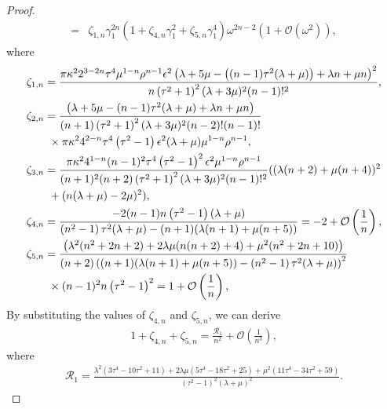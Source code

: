 \documentclass[11pt,reqno,twoside]{amsart}
\theoremstyle{definition}
\theoremstyle{remark}
\numberwithin{equation}{section}
\begin{document}
\begin{proof}
\begin{align}
		=&\zeta _{1,n}\gamma_1 ^{2n}\left(1+\zeta _{4,n} \gamma_1 ^{2}+\zeta _{5,n} \gamma_1 ^{4}\right)\omega ^{2n-2}\left(1+\mathcal{O}(\omega^{2})\right),\label{eq:unorm}
	\end{align}
	where
	\begin{align}
		&\zeta _{1,n}=\frac{\pi  \kappa^2 2^{3-2 n} \tau ^4 \mu ^{1-n} \rho ^{n-1} \epsilon^{2}\left(\lambda +5 \mu -\left((n-1) \tau ^2 (\lambda +\mu )\right)+\lambda  n+\mu  n\right)^2}{n \left(\tau ^2+1\right)^2 (\lambda +3 \mu )^2  (n-1)!^2},\label{eq:zetau}\\
		&\zeta_{2,n}=\frac{\left(\lambda +5 \mu -(n-1) \tau ^2 (\lambda +\mu )+\lambda  n+\mu  n\right)}{(n+1) \left(\tau ^2+1\right)^2 (\lambda +3 \mu )^2(n-2)!(n-1)!}\notag\\
		&\quad\quad\times \pi  \kappa^2 4^{2-n} \tau ^4 \left(\tau ^2-1\right) \epsilon ^2 (\lambda +\mu ) \mu ^{1-n} \rho ^{n-1},\notag\\
		&\zeta_{3,n}=\frac{\pi  \kappa^2 4^{1-n} (n-1)^2 \tau ^4 \left(\tau ^2-1\right)^2 \epsilon ^2 \mu ^{1-n} \rho ^{n-1} }{(n+1)^2 (n+2) \left(\tau ^2+1\right)^2 (\lambda +3 \mu )^2  (n-1)!^2}((\lambda  (n+2)+\mu  (n+4))^2\notag\\
		&\quad\quad+(n (\lambda +\mu )-2 \mu )^2),\notag\\
		&\zeta _{4,n}=\frac{-2 (n-1) n \left(\tau ^2-1\right) (\lambda +\mu )}{\left(n^2-1\right) \tau ^2 (\lambda +\mu )-(n+1) (\lambda  (n+1)+\mu  (n+5))}=-2+\mathcal{O}\left(\frac{1}{n}\right),\notag\\
		&\zeta _{5,n}=\frac{\left(\lambda ^2 (n^2+2n+2)+2 \lambda  \mu  (n (n+2)+4)+\mu ^2 (n^2+2n+10)\right)}{(n+2) \left((n+1) (\lambda  (n+1)+\mu  (n+5))-\left(n^2-1\right) \tau ^2 (\lambda +\mu )\right)^2}\notag\\
		&\quad\quad\times (n-1)^2 n \left(\tau ^2-1\right)^2=1+\mathcal{O}\left(\frac{1}{n}\right),\notag
	\end{align}
	By substituting the values of \(\zeta _{4,n}\) and \(\zeta _{5,n}\), we can derive	
	\begin{align}\label{eq:zetar}
		1+\zeta _{4,n}+\zeta _{5,n}=\frac{\mathcal{R}_{1}}{n^2}+\mathcal{O}\left(\frac{1}{n^3}\right),
	\end{align}	
	where
	\begin{align}\label{eq:R1}
		\mathcal{R}_{1}=\frac{\lambda ^2 \left(3 \tau ^4-10 \tau ^2+11\right)+2 \lambda  \mu  \left(5 \tau ^4-18 \tau ^2+25\right)+\mu ^2 \left(11 \tau ^4-34 \tau ^2+59\right)}{\left(\tau ^2-1\right)^2 (\lambda +\mu )^2}.
	\end{align}

\end{proof}
\end{document}
